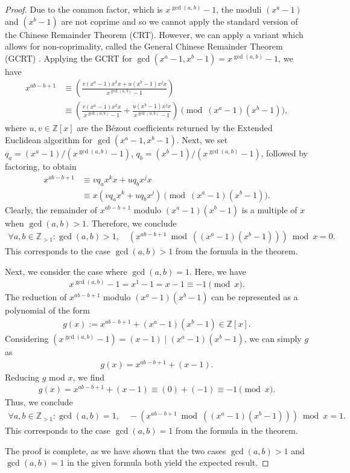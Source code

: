 \documentclass{article}
\theoremstyle{plain}
\theoremstyle{definition}
\newcommand{\Z}{\mathbb{Z}}
\begin{document}
\begin{proof}
Due to the common factor, which is $x^{\gcd(a,b)}-1$, the moduli $(x^a-1)$ and $(x^b-1)$ are not coprime and so we cannot apply the standard version of the Chinese Remainder Theorem (CRT). However, we can apply a variant which allows for non-coprimality, called the General Chinese Remainder Theorem (GCRT) \cite{ore1952crt}. Applying the GCRT for $\gcd(x^a-1,x^b-1) = x^{\gcd(a,b)}-1$, we have 
\begin{align*}
    x^{ab-b+1}
    &\equiv \left( \frac{v(x^a-1)x^{k}x + u(x^b-1)x^{j}x}{x^{\gcd(a,b)}-1} \right) \\
    &\equiv \left( \frac{v(x^a-1)x^{k}x}{x^{\gcd(a,b)}-1} + \frac{u(x^b-1)x^{j}x}{x^{\gcd(a,b)}-1} \right)
    \pmod{(x^a-1)(x^b-1)} ,
\end{align*}
where $u,v \in \Z[x]$ are the B\'ezout coefficients returned by the Extended Euclidean algorithm for $\gcd(x^a-1,x^b-1)$. Next, we set $q_a=(x^a-1)/(x^{\gcd(a,b)}-1)$, $q_b=(x^b-1)/(x^{\gcd(a,b)}-1)$, followed by factoring, to obtain
\begin{align*}
    x^{ab-b+1}
    &\equiv v q_a x^{k}x + u q_b x^{j}x \\
    &\equiv x (v q_a x^k + u q_b x^j)
    \pmod{(x^a-1)(x^b-1)} .
\end{align*}
Clearly, the remainder of $x^{ab-b+1}$ modulo $(x^a-1)(x^b-1)$ is a multiple of $x$ when $\gcd(a,b) > 1$. Therefore, we conclude
\begin{align*}
    \forall a,b \in \Z_{>1} : \gcd(a,b) > 1, \quad
    \left(x^{ab-b+1} \bmod \left((x^a-1)(x^b-1)\right)\right) \bmod x = 0 .
\end{align*}
This corresponds to the case $\gcd(a,b) > 1$ from the formula in the theorem.

Next, we consider the case where $\gcd(a,b) = 1$. Here, we have
\begin{align*}
    x^{\gcd(a,b)} - 1 = x^1 - 1 = x-1 \equiv -1 \pmod{x} .
\end{align*}
The reduction of $x^{ab-b+1}$ modulo $(x^a-1)(x^b-1)$ can be represented as a polynomial of the form
\begin{align*}
    g(x) := x^{ab-b+1} + (x^a-1)(x^b-1) \in \Z[x] .
\end{align*}
Considering $(x^{\gcd(a,b)} - 1) = (x-1) \mid (x^a-1)(x^b-1)$, we can simply $g$ as
\begin{align*}
    g(x) = x^{ab-b+1} + (x-1) .
\end{align*}
Reducing $g$ mod $x$, we find
\begin{align*}
    g(x) = x^{ab-b+1} + (x-1) \equiv (0) + (-1) \equiv -1 \pmod{x} .
\end{align*}
 Thus, we conclude
\begin{align*}
    \forall a,b \in \Z_{>1} : \gcd(a,b) = 1, \quad
    -\left(x^{ab-b+1} \bmod \left((x^a-1)(x^b-1)\right)\right) \bmod x = 1 .
\end{align*}
This corresponds to the case $\gcd(a,b) = 1$ from the formula in the theorem.

The proof is complete, as we have shown that the two cases $\gcd(a,b) > 1$ and $\gcd(a,b) = 1$ in the given formula both yield the expected result.
\end{proof}
\end{document}
